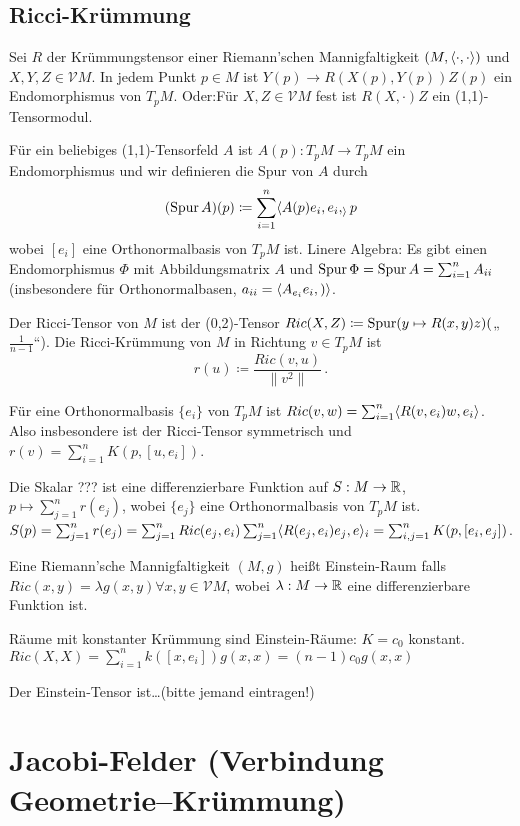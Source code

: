 \documentclass[a4paper,twoside,DIV15,BCOR12mm]{scrbook}
\renewcommand{\da}{\coloneqq}
\newcommand{\V}{\mathcal V}
\begin{document}
\section{Ricci-Krümmung}

Sei $R$ der Krümmungstensor einer Riemann’schen Mannigfaltigkeit $(M,\langle\cdot,\cdot\rangle)$ und $X,Y,Z \in \V M$. In jedem Punkt $p\in M$ ist $Y(p) \to R(X(p),Y(p))Z(p)$ ein Endomorphismus von $T_pM$. Oder:Für $X,Z \in \V M$ fest ist $R(X,\cdot)Z$ ein (1,1)-Tensormodul.

Für ein beliebiges (1,1)-Tensorfeld $A$ ist $A(p):T_pM \to T_pM$ ein Endomorphismus und wir definieren die Spur von $A$ durch
\[
(\spur A)(p) \da \sum_{i=1}^n \ksp {A(p)e_i, e_i}_p
\] wobei $[e_i]$ eine Orthonormalbasis von $T_pM$ ist. Linere Algebra: Es gibt einen Endomorphismus $\Phi$ mit Abbildungsmatrix $A$ und $\mathop{\rm Spur}\nolimits \Phi = \mathop{\rm Spur}\nolimits A = \sum_{i=1}^n A_{ii}$ (insbesondere für Orthonormalbasen, $a_{ii} = \langle A_{e_i} {e_i},)\rangle$.

Der Ricci-Tensor von $M$ ist der (0,2)-Tensor $Ric(X,Z)\da \spur(y\mapsto R(x,y)z)($„$\frac1{n-1}$“). Die Ricci-Krümmung von $M$ in Richtung $v\in T_pM$ ist \[r(u) \da \frac{Ric(v,u)}{\|v^2\|}\,.\]

Für eine Orthonormalbasis $\{e_i\}$ von $T_pM$ ist $Ric(v,w) = \sum_{i=1}^n \langle R(v,e_i)w,e_i\rangle$. Also insbesondere ist der Ricci-Tensor symmetrisch und$r(v) = \sum_{i=1}^n K(p,[u,e_i])$.

Die Skalar ??? ist eine differenzierbare Funktion auf $S:M\to \mathbb{R}$, $p\mapsto \sum_{j=1}^n r(e_j)$, wobei $\{e_j\}$ eine Orthonormalbasis von $T_pM$ ist. $S(p) = \sum_{j=1}^n r(e_j) = \sum_{j=1}^n Ric(e_j, e_i) \sum_{j=1}^n \langle R(e_j, e_i)e_j,e\rangle_i =\sum_{i,j =1}^n K(p, [e_i, e_j])$.

Eine Riemann’sche Mannigfaltigkeit $(M,g)$ heißt Einstein-Raum falls $Ric(x,y) = \lambda g(x,y) \forall x,y\in \V M$, wobei $\lambda:M \to \mathbb{R}$ eine differenzierbare Funktion ist.

\begin{beispiel}
Räume mit konstanter Krümmung sind Einstein-Räume: $K=c_0$ konstant. $Ric(X,X)=\sum_{i=1}^n k([x,e_i]) g(x,x) = (n-1) c_0 g(x,x)$
\end{beispiel}

\begin{bemerkung}
Der Einstein-Tensor ist\dots (bitte jemand eintragen!)
\end{bemerkung}

\chapter{Jacobi-Felder (Verbindung Geometrie--Krümmung)}
\end{document}
